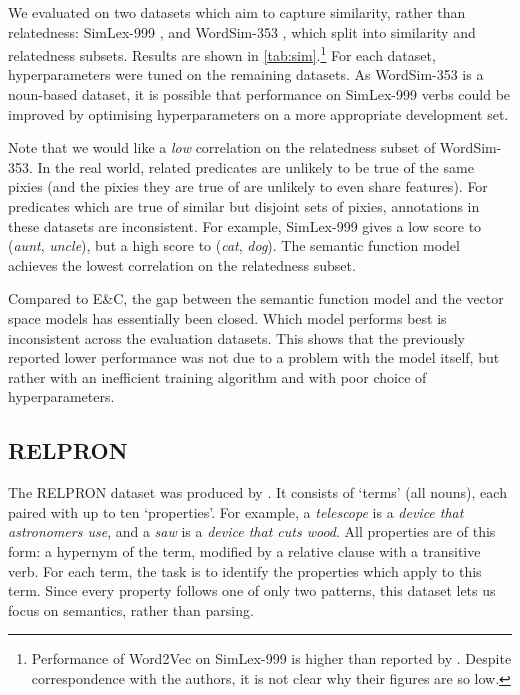 \documentclass[11pt]{article}
\begin{document}
We evaluated on two datasets which aim to capture similarity, rather than relatedness:
SimLex-999 \cite{hill2015simlex},
and WordSim-353 \cite{finkelstein2001wordsim}, 
which  split into similarity and relatedness subsets.
Results are shown in \cref{tab:sim}.\footnote{%
  Performance of Word2Vec on SimLex-999 is higher than reported by .
  Despite correspondence with the authors,
  it is not clear why their figures are so low.
}
For each dataset, hyperparameters were tuned on the remaining datasets.
As WordSim-353 is a noun-based dataset,
it is possible that performance on SimLex-999 verbs could be improved
by optimising hyperparameters on a more appropriate development set.

Note that we would like a \textit{low} correlation on the relatedness subset of WordSim-353.
In the real world, related predicates are unlikely to be true of the same pixies
(and the pixies they are true of are unlikely to even share features).
For predicates which are true of similar but disjoint sets of pixies,
annotations in these datasets are inconsistent.
For example, SimLex-999 gives a low score to (\textit{aunt}, \textit{uncle}),
but a high score to (\textit{cat}, \textit{dog}).
The semantic function model achieves the lowest correlation on the relatedness subset.

Compared to E\&C,
the gap between the semantic function model and the vector space models has essentially been closed.
Which model performs best is inconsistent across the evaluation datasets.
This shows that the previously reported lower performance was not due to a problem with the model itself,
but rather with an inefficient training algorithm and with poor choice of hyperparameters.



\subsection{RELPRON}
\label{sec:rel}

The RELPRON dataset was produced by .
It consists of `terms' (all nouns), each paired with up to ten `properties'.
For example,
a \textit{telescope} is a \textit{device that astronomers use},
and a \textit{saw} is a \textit{device that cuts wood}.
All properties are of this form:
a hypernym of the term,
modified by a relative clause with a transitive verb.
For each term,
the task is to identify the properties which apply to this term.
Since every property follows one of only two patterns,
this dataset lets us focus on semantics, rather than parsing.
\end{document}
